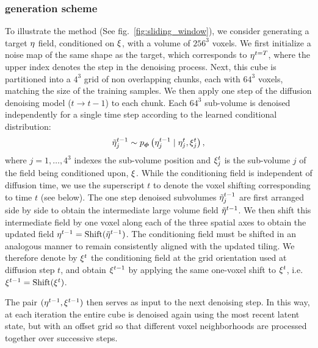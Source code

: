 \subsubsection*{\FOLD generation scheme}
To illustrate the \FOLD method (See fig.~\ref{fig:sliding_window}), we consider generating a target $\eta$ field, conditioned on $\xi$, with a volume of $256^3$ voxels. We first initialize a noise map of the same shape as the target, which corresponds to $\eta^{t=T}$, where the upper index denotes the step in the denoising process. Next, this cube is partitioned into a $4^3$ grid of non overlapping chunks, each with $64^3$ voxels, matching the size of the training samples. We then apply one step of the diffusion denoising model ($t \rightarrow t-1$) to each chunk. Each $64^3$ sub-volume is denoised independently for a single time step according to the learned conditional distribution:
\begin{equation}
    \tilde{\eta}^{t-1}_{j} \sim p_{\boldsymbol{\phi}}\left( \eta^{t-1}_j \mid \eta^{t}_j, \xi_j^t \right),
\end{equation}
where $j=1, \dots, 4^3$ indexes the sub-volume position and $\xi_j^t$ is the sub-volume $j$ of the field being conditioned upon, $\xi$. While the conditioning field is independent of diffusion time, we use the superscript $t$ to denote the voxel shifting corresponding to time $t$ (see below).  The one step denoised subvolumes $\tilde{\eta}^{t-1}_j$ are first arranged side by side to obtain the intermediate large volume field $\tilde{\eta}^{t-1}$. We then shift this intermediate field by one voxel along each of the three spatial axes to obtain the updated field $\eta^{t-1} = \mathrm{Shift}(\tilde{\eta}^{t-1})$.
The conditioning field must be shifted in an analogous manner to remain consistently aligned with the updated tiling. We therefore denote by $\xi^{t}$ the conditioning field at the grid orientation used at diffusion step $t$, and obtain $\xi^{t-1}$ by applying the same one-voxel shift to $\xi^{t}$, i.e. $\xi^{t-1} = \mathrm{Shift}(\xi^{t})$.

The pair $(\eta^{t-1}, \xi^{t-1})$ then serves as input to the next denoising step. In this way, at each iteration the entire cube is denoised again using the most recent latent state, but with an offset grid so that different voxel neighborhoods are processed together over successive steps.

